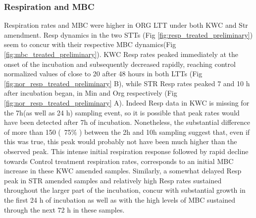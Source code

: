         \subsubsection{Respiration and MBC}
			Respiration rates and MBC were higher in ORG LTT under both KWC and Str amendment.
            Resp dynamics in the two STTs (Fig \ref{fig:resp_treated_preliminary}) seem to concur with their respective MBC dynamics(Fig \ref{fig:mbc_treated_preliminary}). KWC Resp rates peaked immediately at the onset of the incubation and subsequently decreased rapidly, reaching control normalized values of close to 20 \respunit after 48 hours in both LTTs (Fig \ref{fig:nor_resp_treated_preliminary} B), while STR Resp rates peaked 7 and 10 h after incubation began, in Min and Org respectively (Fig \ref{fig:nor_resp_treated_preliminary} A). Indeed Resp data in KWC is missing for the 7h(as well as 24 h) sampling event, so it is possible that peak rates would have been detected after 7h of incubation. Nonetheless, the substantial difference of more than 150 \genericunit (~75$\%$ ) between the 2h and 10h sampling suggest that, even if this was true, this peak would probably not have been much higher than the observed peak. This intense initial respiration response followed by rapid decline towards Control treatment respiration rates, corresponds  to an initial MBC increase in these KWC amended samples. Similarly, a somewhat delayed Resp peak in STR amended samples and relatively high Resp rates sustained throughout the larger part of the incubation, concur with substantial growth in the first 24 h of incubation as well as with the high levels of MBC sustained through the next 72 h in these samples.\\
